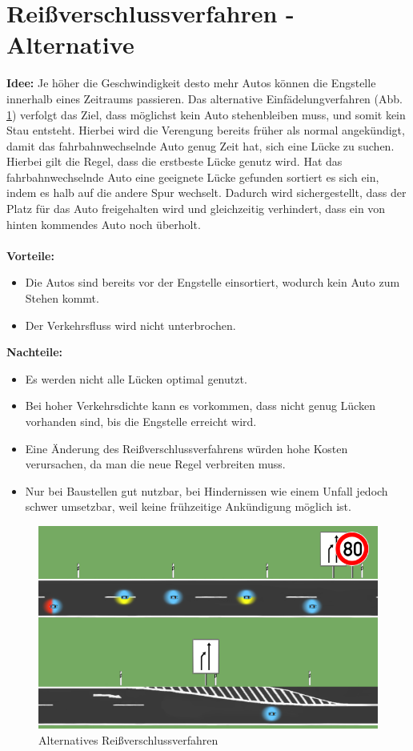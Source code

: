\section{Reißverschlussverfahren - Alternative}
\textbf{Idee:} Je höher die Geschwindigkeit desto mehr Autos können die Engstelle innerhalb eines Zeitraums passieren. Das alternative Einfädelungverfahren (Abb. \ref{fig:alternative}) verfolgt das Ziel, dass möglichst kein Auto stehenbleiben muss, und somit kein Stau entsteht. Hierbei wird die Verengung bereits früher als normal angekündigt, damit das fahrbahnwechselnde Auto genug Zeit hat, sich eine Lücke zu suchen. Hierbei gilt die Regel, dass die erstbeste Lücke genutz wird. Hat das fahrbahnwechselnde Auto eine geeignete Lücke gefunden sortiert es sich ein, indem es halb auf die andere Spur wechselt. Dadurch wird sichergestellt, dass der Platz für das Auto freigehalten wird und gleichzeitig verhindert, dass ein von hinten kommendes Auto noch überholt. \\\\
\textbf{Vorteile:} 
\begin{itemize}
	\item Die Autos sind bereits vor der Engstelle einsortiert, wodurch kein Auto zum Stehen kommt.
\item Der Verkehrsfluss wird nicht unterbrochen.
\end{itemize}
\textbf{Nachteile:}
\begin{itemize}
	\item Es werden nicht alle Lücken optimal genutzt.
\item Bei hoher Verkehrsdichte kann es vorkommen, dass nicht genug Lücken vorhanden sind, bis die Engstelle erreicht wird.
\item Eine Änderung des Reißverschlussverfahrens würden hohe Kosten verursachen, da man die neue Regel verbreiten muss.
\item Nur bei Baustellen gut nutzbar, bei Hindernissen wie einem Unfall jedoch schwer umsetzbar, weil keine frühzeitige Ankündigung möglich ist.
\end{itemize}
\begin{figure}
	\centering
	\includegraphics[width=0.7\linewidth]{images/Alternative}
	\caption{Alternatives Reißverschlussverfahren}
	\label{fig:alternative}
\end{figure}

